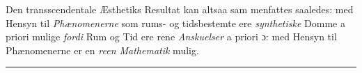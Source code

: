 \documentclass[12pt,a4paper]{book}
\newcommand{\divrule}{\begin{center}\rule{2cm}{0.4pt}\end{center}}
\begin{document}
Den transscendentale Æsthetiks Resultat kan altsaa sam\-%
menfattes saaledes: med Hensyn til \emph{Phænomenerne} som
rums- og tidsbestemte ere \emph{synthetiske} Domme a priori
mulige \emph{fordi} Rum og Tid ere rene \emph{Anskuelser} a priori
ɔ: med Hensyn til Phænomenerne er en \emph{reen Mathematik}
mulig.

\divrule
\end{document}
